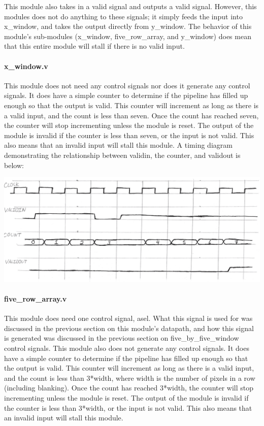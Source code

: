 \documentclass[12pt]{article}
\begin{document}
This module also takes in a valid signal and outputs a valid signal. However, 
this modules does not do anything to these signals; it simply feeds the input 
into x\_window, and takes the output directly from y\_window. The behavior of this 
module's sub-modules (x\_window, five\_row\_array, and y\_window) does mean that 
this entire module will stall if there is no valid input.

\paragraph{x\_window.v}
This module does not need any control signals nor does it generate any control 
signals. It does have a simple counter to determine if the pipeline has filled 
up enough so that the output is valid. This counter will increment as long as 
there is a valid input, and the count is less than seven. Once the count has 
reached seven, the counter will stop incrementing unless the module is reset. 
The output of the module is invalid if the counter is less than seven, or the 
input is not valid. This also means that an invalid input will stall this 
module. A timing diagram demonstrating the relationship between validin, the 
counter, and validout is below:

\includegraphics[width=\textwidth]{processed_image_pngs/timing_1.png}

\paragraph{five\_row\_array.v}
This module does need one control signal, asel. What this signal is used for was discussed in the previous section on this module's datapath, and how this signal is generated was discussed in the previous section on five\_by\_five\_window control signals. This module also does not generate any control signals. It does have a simple counter to determine if the pipeline has filled up enough so that the output is valid. This counter will increment as long as there is a valid input, and the count is less than 3*width, where width is the number of pixels in a row (including blanking). Once the count has reached 3*width, the counter will stop incrementing unless the module is reset. The output of the module is invalid if the counter is less than 3*width, or the input is not valid. This also means that an invalid input will stall this module.
\end{document}
